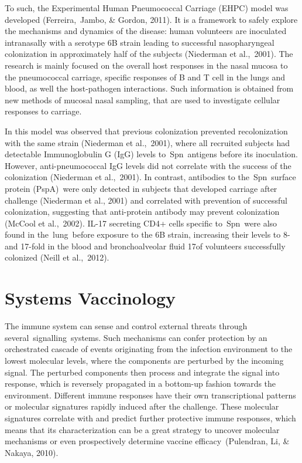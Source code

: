 \documentclass[
]{book}
\begin{document}
To such, the Experimental Human Pneumococcal Carriage (EHPC) model ⁠was developed (Ferreira,~Jambo, \& Gordon, 2011). It is a framework to safely explore the mechanisms and dynamics of the disease: human volunteers are inoculated intranasally with a serotype 6B strain leading to successful nasopharyngeal colonization in approximately half of the subjects (Niederman et al.,~2001)⁠. The research is mainly focused on the overall host responses in the nasal mucosa to the pneumococcal carriage, specific responses of B and T cell in the lungs and blood, as well the host-pathogen interactions. Such information is obtained from new methods of mucosal nasal sampling, that are used to investigate cellular responses to carriage.

In this model was observed that previous colonization prevented recolonization with the same strain (Niederman et al.,~2001)⁠, where all recruited subjects had detectable Immunoglobulin G (IgG) levels to~Spn~antigens before its inoculation. However, anti-pneumococcal IgG levels did not correlate with the success of the colonization (Niederman et al.,~2001)⁠. In contrast, antibodies to the~Spn~surface protein (PspA)~were only detected in subjects that developed carriage after challenge (Niederman et al., 2001) and correlated with prevention of successful colonization, suggesting that anti-protein antibody may prevent colonization (McCool et al.,~2002)⁠. IL-17 secreting CD4+ cells specific to~Spn~were also found in the~lung~before exposure to the 6B strain, increasing their levels to 8- and 17-fold in the blood and bronchoalveolar fluid 17of volunteers successfully colonized (Neill et al.,~2012)⁠.

\hypertarget{systems-vaccinology}{%
\section{\texorpdfstring{\textbf{Systems Vaccinology}}{Systems Vaccinology}}\label{systems-vaccinology}}

The immune system can sense and control external threats through several~signalling~systems. Such mechanisms can confer protection by an orchestrated cascade of events originating from the infection environment to the lowest molecular levels, where the components are perturbed by the incoming signal. The perturbed components then process and integrate the signal into response, which is reversely propagated in a bottom-up fashion towards the environment. Different immune responses have their own transcriptional patterns or molecular signatures rapidly induced after the challenge. These molecular signatures correlate with and predict further protective immune responses, which means that its characterization can be a great strategy to uncover molecular mechanisms or even prospectively determine vaccine efficacy~(Pulendran, Li, \& Nakaya, 2010)⁠.
\end{document}

